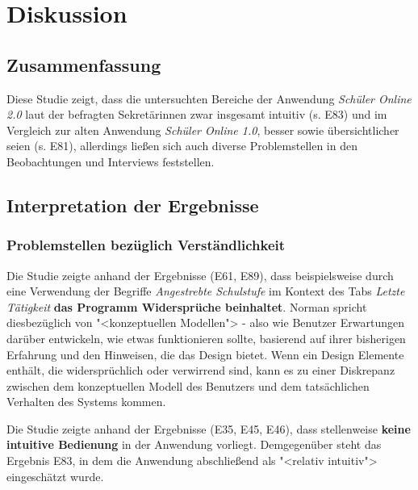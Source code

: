 \section{Diskussion}

\subsection{Zusammenfassung}
Diese Studie zeigt, dass die untersuchten Bereiche der Anwendung \textit{Schüler Online 2.0} laut der befragten Sekretärinnen zwar insgesamt intuitiv (s. E83) und im Vergleich zur alten Anwendung \textit{Schüler Online 1.0}, \glqq besser\grqq{} sowie \glqq übersichtlicher\grqq{} seien (s. E81), allerdings ließen sich auch diverse Problemstellen in den Beobachtungen und Interviews feststellen. 

%

\subsection{Interpretation der Ergebnisse}

\subsubsection{Problemstellen bezüglich Verständlichkeit}

Die Studie zeigte anhand der Ergebnisse (E61, E89), dass beispielsweise durch eine Verwendung der Begriffe \textit{Angestrebte Schulstufe} im Kontext des Tabs \textit{Letzte Tätigkeit} \textbf{das Programm Widersprüche beinhaltet}. Norman spricht diesbezüglich von "<konzeptuellen Modellen"> - also wie Benutzer Erwartungen darüber entwickeln, wie etwas funktionieren sollte, basierend auf ihrer bisherigen Erfahrung und den Hinweisen, die das Design bietet. Wenn ein Design Elemente enthält, die widersprüchlich oder verwirrend sind, kann es zu einer Diskrepanz zwischen dem konzeptuellen Modell des Benutzers und dem tatsächlichen Verhalten des Systems kommen. 

Die Studie zeigte anhand der Ergebnisse (E35, E45, E46), dass stellenweise \textbf{keine intuitive Bedienung} in der Anwendung vorliegt. Demgegenüber steht das Ergebnis E83, in dem die Anwendung abschließend als "<relativ intuitiv"> eingeschätzt wurde.

